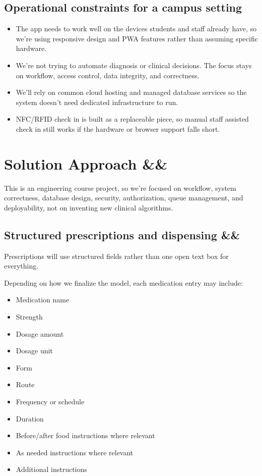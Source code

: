 \documentclass[11pt,a4paper]{article}
\newcommand{\BvrHint}[1]{%
  \ifx&#1&%
  \else
    {\normalfont\normalsize\itshape\hfill #1}%
  \fi}
\begin{document}
\subsection{Operational constraints for a campus setting}

\begin{itemize}
    \item The app needs to work well on the devices students and staff already have, so we're using responsive design and PWA features rather than assuming specific hardware.
    \item We're not trying to automate diagnosis or clinical decisions. The focus stays on workflow, access control, data integrity, and correctness.
    \item We'll rely on common cloud hosting and managed database services so the system doesn't need dedicated infrastructure to run.
    \item NFC/RFID check in is built as a replaceable piece, so manual staff assisted check in still works if the hardware or browser support falls short.
\end{itemize}


\section{Solution Approach \BvrHint{}}

This is an engineering course project, so we're focused on workflow, system correctness, database design, security, authorization, queue management, and deployability, not on inventing new clinical algorithms.

\subsection{Structured prescriptions and dispensing \BvrHint{}}

Prescriptions will use structured fields rather than one open text box for everything.

Depending on how we finalize the model, each medication entry may include:

\begin{itemize}
    \item Medication name
    \item Strength
    \item Dosage amount
    \item Dosage unit
    \item Form
    \item Route
    \item Frequency or schedule
    \item Duration
    \item Before/after food instructions where relevant
    \item As needed instructions where relevant
    \item Additional instructions
\end{itemize}
\end{document}

